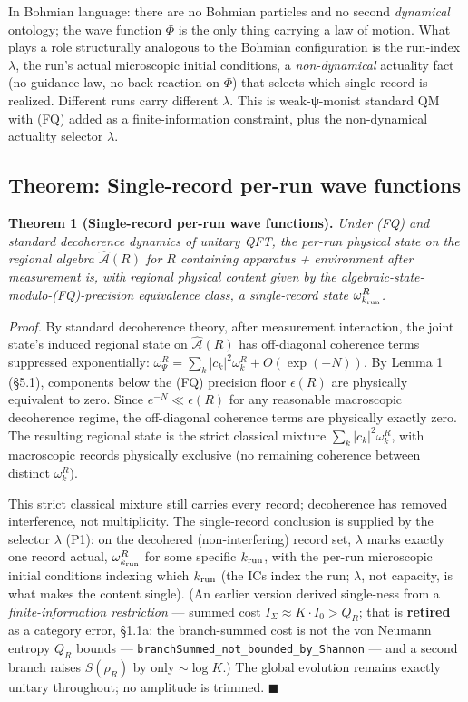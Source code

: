 \documentclass[11pt,a4paper]{article}
\begin{document}
In Bohmian language: there are no Bohmian particles and no second \emph{dynamical} ontology; the wave function $\Phi$ is the only thing carrying a law of motion. What plays a role structurally analogous to the Bohmian configuration is the run-index $\lambda$, the run's actual microscopic initial conditions, a \emph{non-dynamical} actuality fact (no guidance law, no back-reaction on $\Phi$) that selects which single record is realized. Different runs carry different $\lambda$. This is weak-ψ-monist standard QM with (FQ) added as a finite-information constraint, plus the non-dynamical actuality selector $\lambda$.

\subsection{Theorem: Single-record per-run wave functions}

\textbf{Theorem 1 (Single-record per-run wave functions).} \emph{Under (FQ) and standard decoherence dynamics of unitary QFT, the per-run physical state on the regional algebra $\hat{\mathcal{A}}(R)$ for $R$ containing apparatus + environment after measurement is, with regional physical content given by the algebraic-state-modulo-(FQ)-precision equivalence class, a single-record state $\omega_{k_{\rm run}}^R$.}

\emph{Proof.} By standard decoherence theory, after measurement interaction, the joint state's induced regional state on $\hat{\mathcal{A}}(R)$ has off-diagonal coherence terms suppressed exponentially: $\omega_\Psi^R = \sum_k |c_k|^2 \omega_k^R + O(\exp(-N))$. By Lemma 1 (§5.1), components below the (FQ) precision floor $\epsilon(R)$ are physically equivalent to zero. Since $e^{-N} \ll \epsilon(R)$ for any reasonable macroscopic decoherence regime, the off-diagonal coherence terms are physically exactly zero. The resulting regional state is the strict classical mixture $\sum_k |c_k|^2 \omega_k^R$, with macroscopic records physically exclusive (no remaining coherence between distinct $\omega_k^R$).

This strict classical mixture still carries every record; decoherence has removed interference, not multiplicity. The single-record conclusion is supplied by the selector $\lambda$ (P1): on the decohered (non-interfering) record set, $\lambda$ marks exactly one record actual, $\omega_{k_{\rm run}}^R$ for some specific $k_{\rm run}$, with the per-run microscopic initial conditions indexing which $k_{\rm run}$ (the ICs index the run; $\lambda$, not capacity, is what makes the content single). (An earlier version derived single-ness from a \emph{finite-information restriction} — summed cost $I_\Sigma \approx K\cdot I_0 > Q_R$; that is \textbf{retired} as a category error, §1.1a: the branch-summed cost is not the von Neumann entropy $Q_R$ bounds — \texttt{branchSummed\_not\_bounded\_by\_Shannon} — and a second branch raises $S(\rho_R)$ by only $\sim\!\log K$.) The global evolution remains exactly unitary throughout; no amplitude is trimmed. $\blacksquare$
\end{document}
